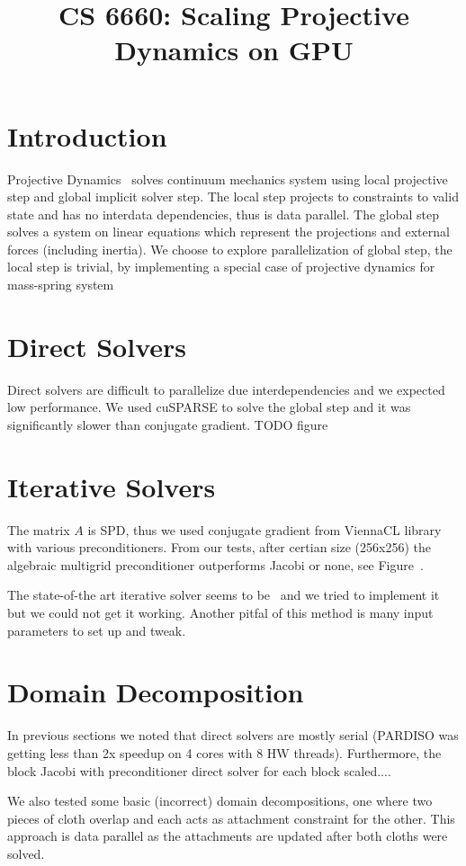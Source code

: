 \documentclass{article}
\title{CS 6660: Scaling Projective Dynamics on GPU}
\begin{document}
\maketitle

\section{Introduction}
Projective Dynamics~\cite{Bouaziz14} solves continuum mechanics system using
local projective step and global implicit solver step. The local step projects
to constraints to valid state and has no interdata dependencies, thus is data
parallel. The global step solves a system on linear equations which represent
the projections and external forces (including inertia). We choose to explore
parallelization of global step, the local step is trivial, by implementing
a special case of projective dynamics for mass-spring system~\cite{Liu13}


\section{Direct Solvers}
Direct solvers are difficult to parallelize due interdependencies and we
expected low performance. We used cuSPARSE to solve the global step and it
was significantly slower than conjugate gradient. TODO figure


\section{Iterative Solvers}
The matrix $A$ is SPD, thus we used conjugate gradient from ViennaCL library
with various preconditioners. From our tests, after certian size (256x256)
the algebraic multigrid preconditioner outperforms Jacobi or none,
see Figure~.

The state-of-the art iterative solver seems to be~\cite{Wang15} and we tried
to implement it but we could not get it working. Another pitfal of this method
is many input parameters to set up and tweak.


\section{Domain Decomposition}
In previous sections we noted that direct solvers are mostly serial (PARDISO
was getting less than 2x speedup on 4 cores with 8 HW threads). Furthermore,
the block Jacobi with preconditioner direct solver for each block scaled....

We also tested some basic (incorrect) domain decompositions, one where two
pieces of cloth overlap and each acts as attachment constraint for the other.
This approach is data parallel as the attachments are updated after both
cloths were solved.
\end{document}
